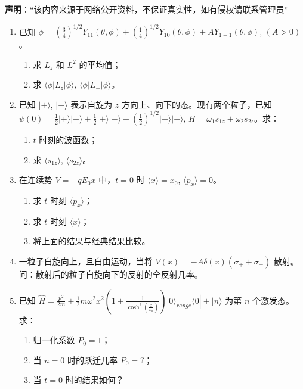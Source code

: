 
\textbf{声明}：“该内容来源于网络公开资料，不保证真实性，如有侵权请联系管理员”

\begin{enumerate}
    \item 已知 $\phi = \left(\frac{3}{4}\right)^{1/2} Y_{11}(\theta, \phi) + \left(\frac{1}{4}\right)^{1/2} Y_{10}(\theta, \phi) + A Y_{1-1}(\theta, \phi)$, $(A > 0)$。
    \begin{enumerate}
        \item 求 $L_z$ 和 $L^2$ 的平均值；
        \item 求 $\langle \phi | L_z | \phi \rangle$, $\langle \phi | L_- | \phi \rangle$。
    \end{enumerate}
    
    \item 已知 $|+\rangle$, $|-\rangle$ 表示自旋为 $z$ 方向上、向下的态。现有两个粒子，已知 $\psi(0) = \frac{1}{2} |+\rangle |+\rangle + \frac{1}{2} |+\rangle |-\rangle + (\frac{1}{2})^{1/2} |-\rangle |-\rangle$, $H = \omega_1 s_{1z} + \omega_2 s_{2z}$。求：
    \begin{enumerate}
        \item $t$ 时刻的波函数；
        \item 求 $\langle s_{1z} \rangle$, $\langle s_{2z} \rangle$。
    \end{enumerate}
    
    \item 在连续势 $V = -q E_0 x$ 中，$t = 0$ 时 $\langle x \rangle = x_0$, $\langle p_x \rangle = 0$。
    \begin{enumerate}
        \item 求 $t$ 时刻 $\langle p_x \rangle$；
        \item 求 $t$ 时刻 $\langle x \rangle$；
        \item 将上面的结果与经典结果比较。
    \end{enumerate}
    
    \item 一粒子自旋向上，且自由运动，当将 $V(x) = -A \delta(x)(\sigma_+ + \sigma_-)$ 散射。问：散射后的粒子自旋向下的反射的全反射几率。
    
    \item 已知 $\hat{H} = \frac{p^2}{2m} + \frac{1}{2} m \omega^2 x^2 \left(1 + \frac{1}{\cosh^2(\frac{x}{x_0})}\right) |0\rangle_{range} \langle 0| + |n\rangle$ 为第 $n$ 个激发态。求：
    \begin{enumerate}
        \item 归一化系数 $P_0 = 1$；
        \item 当 $n = 0$ 时的跃迁几率 $P_0 = ?$；
        \item 当 $t = 0$ 时的结果如何？
    \end{enumerate}
\end{enumerate}